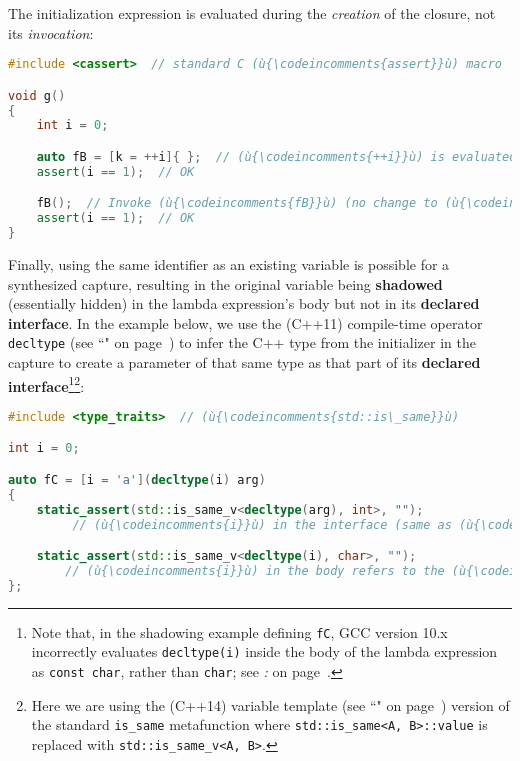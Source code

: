 \noindent The initialization expression is evaluated during the \emph{creation} of
the closure, not its \emph{invocation}:

\begin{lstlisting}[language=C++]
#include <cassert>  // standard C (ù{\codeincomments{assert}}ù) macro

void g()
{
    int i = 0;

    auto fB = [k = ++i]{ };  // (ù{\codeincomments{++i}}ù) is evaluated at creation only.
    assert(i == 1);  // OK

    fB();  // Invoke (ù{\codeincomments{fB}}ù) (no change to (ù{\codeincomments{i}}ù)).
    assert(i == 1);  // OK
}
\end{lstlisting}

\noindent Finally, using the same identifier as an existing
variable is possible for a synthesized capture, resulting in the original variable
being \textbf{shadowed} (essentially hidden) in the lambda expression's
body but not in its \textbf{declared interface}. In the example below,
we use the (C++11) compile-time operator
\texttt{decltype} (see ``" on page~\pageref{decltype}) to infer the C++ type from the
initializer in the capture to create a parameter of that same type as
that part of its \textbf{declared interface}{\cprotect\footnote{Note
that, in the shadowing example defining \texttt{fC}, GCC version 10.x
incorrectly evaluates \texttt{decltype(i)} inside the body of the
lambda expression as \texttt{const}~\texttt{char}, rather than
  \texttt{char}; see \textit{: } on page~\pageref{potential-pitfalls-lambdacapture}.}}{\cprotect\footnote{Here we are using the (C++14) variable
  template (see ``" on page~\pageref{variable-templates}) version of the standard \texttt{is\_same} metafunction where \texttt{std::is\_same<A,}~\texttt{B>::value} is replaced with
  \texttt{std::is\_same\_v<A,}~\texttt{B>}.}}:

\begin{lstlisting}[language=C++]
#include <type_traits>  // (ù{\codeincomments{std::is\_same}}ù)

int i = 0;

auto fC = [i = 'a'](decltype(i) arg)
{
    static_assert(std::is_same_v<decltype(arg), int>, "");
         // (ù{\codeincomments{i}}ù) in the interface (same as (ù{\codeincomments{arg}}ù)) refers to the (ù{\codeincomments{int}}ù) parameter.

    static_assert(std::is_same_v<decltype(i), char>, "");
        // (ù{\codeincomments{i}}ù) in the body refers to the (ù{\codeincomments{char}}ù) data member deduced at capture.
};
\end{lstlisting}


